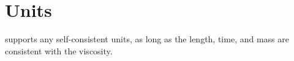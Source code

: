 \section{Units}

\iamr supports any self-consistent units, as long as the length, time, and mass are
consistent with the viscosity.
